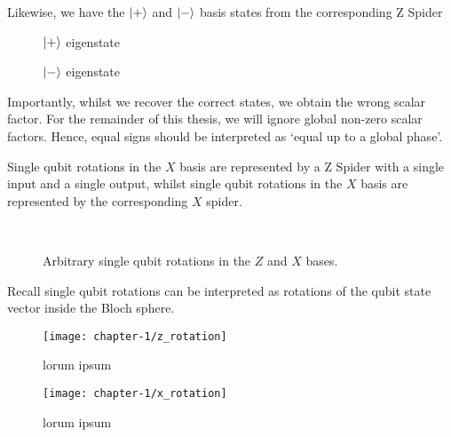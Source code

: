 Likewise, we have the $\ket +$ and $\ket -$ basis states from the corresponding Z Spider
\begin{figure}[H]
\centering
\begin{minipage}{.4\textwidth}
    \centering
    \caption{$\ket +$ eigenstate}
\end{minipage}%
\begin{minipage}{.4\textwidth}
    \centering
    \caption{$\ket -$ eigenstate}
\end{minipage}
\end{figure}

Importantly, whilst we recover the correct states, we obtain the wrong scalar factor. For the remainder of this thesis, we will ignore global non-zero scalar factors. Hence, equal signs should be interpreted as `equal up to a global phase'.

Single qubit rotations in the $X$ basis are represented by a Z Spider with a single input and a single output, whilst single qubit rotations in the $X$ basis are represented by the corresponding $X$ spider.
\begin{figure}[H]
\centering
{} \\[1ex]
\caption{Arbitrary single qubit rotations in the $Z$ and $X$ bases.}
\end{figure}

Recall single qubit rotations can be interpreted as rotations of the qubit state vector inside the Bloch sphere.
\begin{figure}[H]
\centering
\begin{minipage}{.4\textwidth}
    \centering
    \texttt{[image: chapter-1/z\_rotation]}
    \caption{lorum ipsum}
\end{minipage}%
\begin{minipage}{.4\textwidth}
    \centering
    \texttt{[image: chapter-1/x\_rotation]}
    \caption{lorum ipsum}
\end{minipage}
\end{figure}


